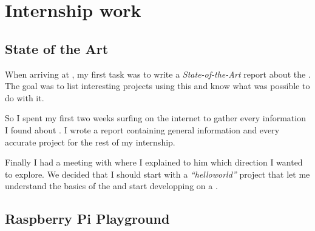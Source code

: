 
\chapter{Internship work} %

\label{Chapter2} %




\section{State of the Art}

When arriving at \groupname{}, my first task was to write a \emph{State-of-the-Art} report about the \vc{}. The goal was to list interesting projects using this  and know what was possible to do with it.

So I spent my first two weeks surfing on the internet to gather every information I found about \vc. I wrote a report containing general information and every accurate project for the rest of my internship.

Finally I had a meeting with \supname{} where I explained to him which direction I wanted to explore. We decided that I should start with a \emph{\enquote{helloworld}} project that let me understand the basics of the \vc{} and start developping on a \rasp.


\section{Raspberry Pi Playground}

